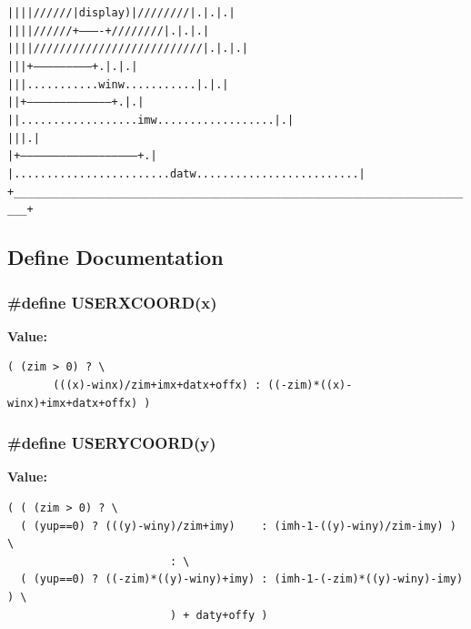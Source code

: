 \begin{alltt}
    |        |        |       |//////| display) |////////| .  | .  | .       |
    |        |        |       |//////+----------+////////| .  | .  | .       |
    |        |        |       |//////////////////////////| .  | .  | .       |
    |        |        |       +--------------------------+ .  | .  | .       |
    |        |        |       ........... winw ...........    | .  | .       |
    |        |        +---------------------------------------+ .  | .       |
    |        |        .................. imw ..................    | .       |
    |        |                                                     | .       |
    |        +-----------------------------------------------------+ .       |
    |        ........................ datw .........................         |
    +\_\_\_\_\_\_\_\_\_\_\_\_\_\_\_\_\_\_\_\_\_\_\_\_\_\_\_\_\_\_\_\_\_\_\_\_\_\_\_\_\_\_\_\_\_\_\_\_\_\_\_\_\_\_\_\_\_\_\_\_\_\_\_\_\_\_\_\_\_\_\_\_+
\end{alltt}\normalsize 


\subsection{Define Documentation}
\subsubsection{\setlength{\rightskip}{0pt plus 5cm}\#define USERXCOORD(x)}\label{xtv_8h_a26}


{\bf Value:}

\footnotesize\begin{verbatim}( (zim > 0) ? \
       (((x)-winx)/zim+imx+datx+offx) : ((-zim)*((x)-winx)+imx+datx+offx) )
\end{verbatim}\normalsize 
{}
\subsubsection{\setlength{\rightskip}{0pt plus 5cm}\#define USERYCOORD(y)}\label{xtv_8h_a27}


{\bf Value:}

\footnotesize\begin{verbatim}( ( (zim > 0) ? \
  ( (yup==0) ? (((y)-winy)/zim+imy)    : (imh-1-((y)-winy)/zim-imy) ) \
                         : \
  ( (yup==0) ? ((-zim)*((y)-winy)+imy) : (imh-1-(-zim)*((y)-winy)-imy) ) \
                         ) + daty+offy )
\end{verbatim}\normalsize 


